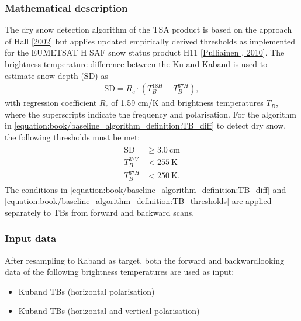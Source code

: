 \documentclass[letterpaper,10pt,english]{jupyterBook}
\begin{document}
\subsubsection{Mathematical description}
\label{\detokenize{book/baseline_algorithm_definition:mathematical-description}}
\sphinxAtStartPar
The dry snow detection algorithm of the TSA product is based on the approach of Hall  {[}\hyperlink{cite.book/references:id2}{2002}{]} but applies updated empirically derived thresholds as implemented for the EUMETSAT H SAF snow status product H11 {[}\hyperlink{cite.book/references:id3}{Pulliainen , 2010}{]}. The brightness temperature difference between the Ku and Ka\sphinxhyphen{}band is used to estimate snow depth (SD) as
\begin{equation}\label{equation:book/baseline_algorithm_definition:TB_diff}
\begin{split}\text{SD} = R_c \cdot (T_B^{18H}-T_B^{37H}),\end{split}
\end{equation}
\sphinxAtStartPar
with regression coefficient \(R_c\) of 1.59 cm/K and brightness temperatures \(T_B\), where the superscripts indicate the frequency and polarisation.
For the algorithm in \eqref{equation:book/baseline_algorithm_definition:TB_diff} to detect dry snow, the following thresholds must be met:
\begin{equation}\label{equation:book/baseline_algorithm_definition:TB_thresholds}
\begin{split}\begin{aligned}
\text{SD} &≥ 3.0~\text{cm}\\
T_B^{37V} &< 255~\text{K}\\
T_B^{37H} &< 250~\text{K}.
\end{aligned}\end{split}
\end{equation}
\sphinxAtStartPar
The conditions in \eqref{equation:book/baseline_algorithm_definition:TB_diff} and \eqref{equation:book/baseline_algorithm_definition:TB_thresholds} are applied separately to TBs from forward and backward scans.


\subsubsection{Input data}
\label{\detokenize{book/baseline_algorithm_definition:input-data}}
\sphinxAtStartPar
After resampling to Ka\sphinxhyphen{}band as target, both the forward and backward\sphinxhyphen{}looking data of the following brightness temperatures are used as input:
\begin{itemize}
\item {} 
\sphinxAtStartPar
Ku\sphinxhyphen{}band TBs (horizontal polarisation)

\item {} 
\sphinxAtStartPar
Ku\sphinxhyphen{}band TBs (horizontal and vertical polarisation)

\end{itemize}
\end{document}
